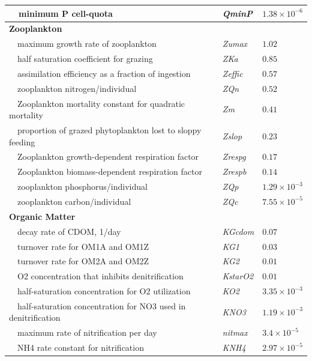 \documentclass[letterpaper,12pt,oneside]{article}\usepackage[]{graphicx}\usepackage[]{color}
\begin{document}
\begin{table}[!tbp]
{\begin{center}
\begin{tabular}{lll}
~~minimum P cell-quota&\textit{QminP}&$1.38\times 10^{-6}$\tabularnewline
\hline
{\bfseries Zooplankton}&&\tabularnewline
~~maximum growth rate of zooplankton&\textit{Zumax}&$1.02$\tabularnewline
~~half saturation coefficient for grazing&\textit{ZKa}&$0.85$\tabularnewline
~~assimilation efficiency as a fraction of ingestion&\textit{Zeffic}&$0.57$\tabularnewline
~~zooplankton nitrogen/individual&\textit{ZQn}&$0.52$\tabularnewline
~~Zooplankton mortality constant for quadratic mortality&\textit{Zm}&$0.41$\tabularnewline
~~proportion of grazed phytoplankton lost to sloppy feeding&\textit{Zslop}&$0.23$\tabularnewline
~~Zooplankton growth-dependent respiration factor&\textit{Zrespg}&$0.17$\tabularnewline
~~Zooplankton biomass-dependent respiration factor&\textit{Zrespb}&$0.14$\tabularnewline
~~zooplankton phosphorus/individual&\textit{ZQp}&$1.29\times 10^{-3}$\tabularnewline
~~zooplankton carbon/individual&\textit{ZQc}&$7.55\times 10^{-5}$\tabularnewline
\hline
{\bfseries Organic Matter}&&\tabularnewline
~~decay rate of CDOM, 1/day&\textit{KGcdom}&$0.07$\tabularnewline
~~turnover rate for OM1A and OM1Z&\textit{KG1}&$0.03$\tabularnewline
~~turnover rate for OM2A and OM2Z&\textit{KG2}&$0.01$\tabularnewline
~~O2 concentration that inhibits denitrification&\textit{KstarO2}&$0.01$\tabularnewline
~~half-saturation concentration for O2 utilization&\textit{KO2}&$3.35\times 10^{-3}$\tabularnewline
~~half-saturation concentration for NO3 used in denitrification&\textit{KNO3}&$1.19\times 10^{-3}$\tabularnewline
~~maximum rate of nitrification per day&\textit{nitmax}&$3.4\times 10^{-5}$\tabularnewline
~~NH4 rate constant for nitrification&\textit{KNH4}&$2.97\times 10^{-5}$\tabularnewline
\hline
\end{tabular}\end{center}}

\end{table}
\end{document}
